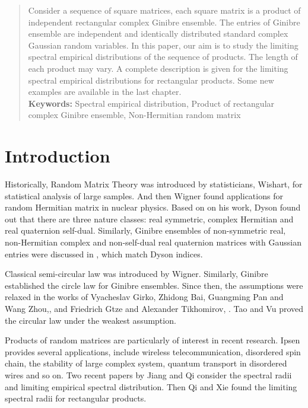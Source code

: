 \documentclass[12pt]{article}
\theoremstyle{plain}
\theoremstyle{definition}
\theoremstyle{remark}
\begin{document}
\begin{abstract}
Consider a sequence of square matrices, each square matrix is a product of independent rectangular complex Ginibre ensemble. The entries of Ginibre ensemble are independent and identically distributed standard complex Gaussian random variables. In this paper, our aim is to study the limiting spectral empirical distributions of the sequence of products. The length of each product may vary. A complete description is given for the limiting spectral empirical distributions for rectangular products. Some new examples are available in the last chapter. \\
{\bf Keywords:} Spectral empirical distribution, Product of rectangular complex Ginibre ensemble, Non-Hermitian random matrix
\end{abstract}


\newpage
\tableofcontents

\newpage



\section{Introduction}\label{sec:intro}
Historically, Random Matrix Theory was introduced by statisticians, Wishart\cite{wishart}, for statistical analysis of large samples. And then Wigner found applications for random Hermitian matrix in nuclear physics. Based on on his work, Dyson \cite{Dyson} found out that there are three nature classes: real symmetric, complex Hermitian and real quaternion self-dual. Similarly, Ginibre ensembles of non-symmetric real, non-Hermitian complex and non-self-dual real quaternion matrices with Gaussian entries were discussed in \cite{Ginibre}, which match Dyson indices.

Classical semi-circular law was introduced by Wigner. Similarly, Ginibre\cite{Ginibre} established the circle law for Ginibre ensembles. Since then, the assumptions were relaxed in the works of Vyacheslav Girko,\cite{Girko} Zhidong Bai,\cite{Bai} Guangming Pan and Wang Zhou,\cite{Pan}, and Friedrich Gtze and Alexander Tikhomirov, \cite{GF-TA}. Tao and Vu\cite{Tao} proved the circular law under the weakest assumption. 

Products of random matrices are particularly of interest in recent research. Ipsen\cite{Ipsen} provides several applications, include wireless telecommunication, disordered spin chain, the stability of large complex system, quantum transport in disordered wires and so on. Two recent papers by Jiang and Qi\cite{JiangQi2019}\cite{2017} consider the spectral radii and limiting empirical spectral distribution. Then Qi and Xie\cite{SRP} found the limiting spectral radii for rectangular products.
\end{document}
